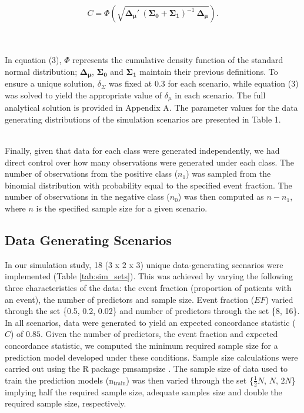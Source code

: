 \documentclass[AMA,STIX1COL,]{WileyNJD-v2}
\begin{document}
\begin{equation}
C = \Phi \left( \sqrt{\pmb{\Delta_\mu}{'}\  (\pmb{\Sigma_0} + \pmb{\Sigma_1})^{-1} \ \pmb{\Delta_{\mu}}} \right).
\end{equation}\\
\strut \\
In equation (3), \(\Phi\) represents the cumulative density function of
the standard normal distribution; \(\pmb{\Delta_\mu}\),
\(\pmb{\Sigma_0}\) and \(\pmb{\Sigma_1}\) maintain their previous
definitions. To ensure a unique solution, \(\delta_\Sigma\) was fixed at
0.3 for each scenario, while equation (3) was solved to yield the
appropriate value of \(\delta_\mu\) in each scenario. The full
analytical solution is provided in Appendix A. The parameter values for
the data generating distributions of the simulation scenarios are
presented in Table 1.\\
\strut \\
Finally, given that data for each class were generated independently, we
had direct control over how many observations were generated under each
class. The number of observations from the positive class (\(n_1\)) was
sampled from the binomial distribution with probability equal to the
specified event fraction. The number of observations in the negative
class (\(n_0\)) was then computed as \(n - n_1\), where \(n\) is the
specified sample size for a given scenario.\\

\hypertarget{data-generating-scenarios}{%
\subsection{Data Generating Scenarios}\label{data-generating-scenarios}}

In our simulation study, 18 (\(3\) x \(2\) x \(3\)) unique
data-generating scenarios were implemented (Table \ref{tab:sim_sets}).
This was achieved by varying the following three characteristics of the
data: the event fraction (proportion of patients with an event), the
number of predictors and sample size. Event fraction (\(EF\)) varied
through the set \{0.5, 0.2, 0.02\} and number of predictors through the
set \{8, 16\}. In all scenarios, data were generated to yield an
expected concordance statistic (\(C\)) of \(0.85\). Given the number of
predictors, the event fraction and expected concordance statistic, we
computed the minimum required sample size for a prediction model
developed under these conditions. Sample size calculations were carried
out using the R package pmsampsize \citep{pmsampsize}. The sample size
of data used to train the prediction models
(\(\mathrm{n}_{\mathrm{train}}\)) was then varied through the set
\{\(\frac{1}{2}N\), \(N\), \(2N\)\} implying half the required sample
size, adequate samples size and double the required sample size,
respectively.
\end{document}
